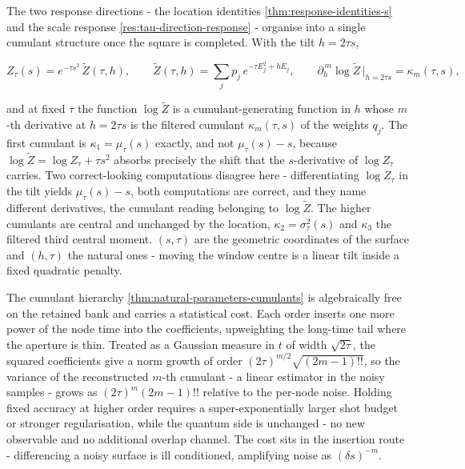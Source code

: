 The two response directions - the location identities \eqref{thm:response-identities-s} and the scale response \eqref{res:tau-direction-response} - organise into a single cumulant structure once the square is completed. With the tilt $h=2\tau s$,
\begin{widetext}
\begin{equation}\label{thm:natural-parameters-cumulants}
Z_\tau(s)=e^{-\tau s^{2}}\,\widetilde Z(\tau,h),\qquad \widetilde Z(\tau,h)=\sum_j p_j\,e^{-\tau E_j^{2}+hE_j},\qquad \partial_h^{\,m}\log\widetilde Z\,\Big|_{h=2\tau s}=\kappa_m(\tau,s),
\end{equation}
\end{widetext}
and at fixed $\tau$ the function $\log\widetilde Z$ is a cumulant-generating function in $h$ whose $m$-th derivative at $h=2\tau s$ is the filtered cumulant $\kappa_m(\tau,s)$ of the weights $q_j$. The first cumulant is $\kappa_1=\mu_\tau(s)$ exactly, and not $\mu_\tau(s)-s$, because $\log\widetilde Z=\log Z_\tau+\tau s^{2}$ absorbs precisely the shift that the $s$-derivative of $\log Z_\tau$ carries. Two correct-looking computations disagree here - differentiating $\log Z_\tau$ in the tilt yields $\mu_\tau(s)-s$, both computations are correct, and they name different derivatives, the cumulant reading belonging to $\log\widetilde Z$. The higher cumulants are central and unchanged by the location, $\kappa_2=\sigma_\tau^{2}(s)$ and $\kappa_3$ the filtered third central moment. $(s,\tau)$ are the geometric coordinates of the surface and $(h,\tau)$ the natural ones - moving the window centre is a linear tilt inside a fixed quadratic penalty.

The cumulant hierarchy \eqref{thm:natural-parameters-cumulants} is algebraically free on the retained bank and carries a statistical cost. Each order inserts one more power of the node time into the coefficients, upweighting the long-time tail where the aperture is thin. Treated as a Gaussian measure in $t$ of width $\sqrt{2\tau}$, the squared coefficients give a norm growth of order $(2\tau)^{m/2}\sqrt{(2m-1)!!}$, so the variance of the reconstructed $m$-th cumulant - a linear estimator in the noisy samples - grows as $(2\tau)^{m}(2m-1)!!$ relative to the per-node noise. Holding fixed accuracy at higher order requires a super-exponentially larger shot budget or stronger regularisation, while the quantum side is unchanged - no new observable and no additional overlap channel. The cost sits in the insertion route - differencing a noisy surface is ill conditioned, amplifying noise as $(\delta s)^{-m}$.

